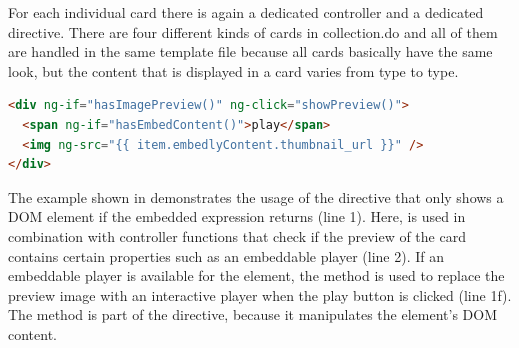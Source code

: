 For each individual card there is again a dedicated controller and a dedicated directive. There are four different kinds of cards in collection.do and all of them are handled in the same template file because all cards basically have the same look, but the content that is displayed in a card varies from type to type. 

\begin{lstlisting}[language=HTML, caption=CardListController template, label=lst:card-template]
<div ng-if="hasImagePreview()" ng-click="showPreview()">
  <span ng-if="hasEmbedContent()">play</span>
  <img ng-src="{{ item.embedlyContent.thumbnail_url }}" />
</div>
\end{lstlisting}

The example shown in  demonstrates the usage of the  directive that only shows a DOM element if the embedded expression returns  (line 1). Here,  is used in combination with controller functions that check if the preview of the card contains certain properties such as an embeddable player (line 2). If an embeddable player is available for the element, the  method is used to replace the preview image with an interactive player when the play button is clicked (line 1f). The  method is part of the directive, because it manipulates the element's DOM content.